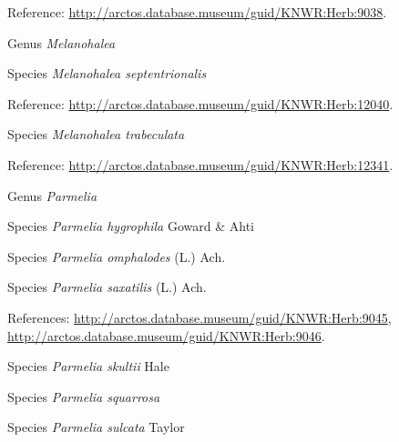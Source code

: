 \documentclass[9pt, article]{memoir}
\begin{document}
\begin{multicols}{2}
\vspace{6pt}Reference: 
\url{http://arctos.database.museum/guid/KNWR:Herb:9038}.

\vspace{6pt}\noindent\hspace{30pt}Genus \textit{Melanohalea}


\vspace{6pt}\noindent\hspace{36pt}Species \textit{Melanohalea septentrionalis}


\vspace{6pt}Reference: 
\url{http://arctos.database.museum/guid/KNWR:Herb:12040}.

\vspace{6pt}\noindent\hspace{36pt}Species \textit{Melanohalea trabeculata}


\vspace{6pt}Reference: 
\url{http://arctos.database.museum/guid/KNWR:Herb:12341}.

\vspace{6pt}\noindent\hspace{30pt}Genus \textit{Parmelia}


\vspace{6pt}\noindent\hspace{36pt}Species \textit{Parmelia hygrophila} Goward \& Ahti


\vspace{6pt}\noindent\hspace{36pt}Species \textit{Parmelia omphalodes} (L.) Ach.


\vspace{6pt}\noindent\hspace{36pt}Species \textit{Parmelia saxatilis} (L.) Ach.


\vspace{6pt}References: 
\url{http://arctos.database.museum/guid/KNWR:Herb:9045}, 
\url{http://arctos.database.museum/guid/KNWR:Herb:9046}.

\vspace{6pt}\noindent\hspace{36pt}Species \textit{Parmelia skultii} Hale


\vspace{6pt}\noindent\hspace{36pt}Species \textit{Parmelia squarrosa}


\vspace{6pt}\noindent\hspace{36pt}Species \textit{Parmelia sulcata} Taylor



\end{multicols}
\end{document}
